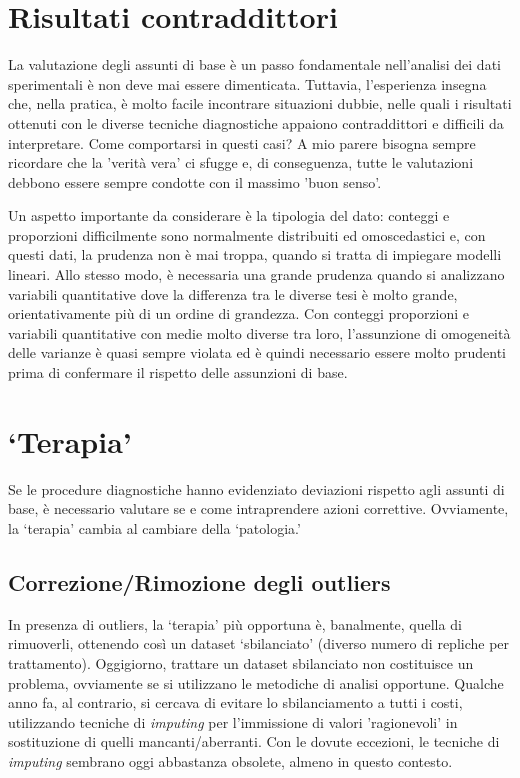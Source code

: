 \documentclass[a4paper,12pt,oneside]{book}
\begin{document}
\hypertarget{risultati-contraddittori}{%
\section{Risultati contraddittori}\label{risultati-contraddittori}}

La valutazione degli assunti di base è un passo fondamentale nell'analisi dei dati sperimentali è non deve mai essere dimenticata. Tuttavia, l'esperienza insegna che, nella pratica, è molto facile incontrare situazioni dubbie, nelle quali i risultati ottenuti con le diverse tecniche diagnostiche appaiono contraddittori e difficili da interpretare. Come comportarsi in questi casi? A mio parere bisogna sempre ricordare che la 'verità vera' ci sfugge e, di conseguenza, tutte le valutazioni debbono essere sempre condotte con il massimo 'buon senso'.

Un aspetto importante da considerare è la tipologia del dato: conteggi e proporzioni difficilmente sono normalmente distribuiti ed omoscedastici e, con questi dati, la prudenza non è mai troppa, quando si tratta di impiegare modelli lineari. Allo stesso modo, è necessaria una grande prudenza quando si analizzano variabili quantitative dove la differenza tra le diverse tesi è molto grande, orientativamente più di un ordine di grandezza. Con conteggi proporzioni e variabili quantitative con medie molto diverse tra loro, l'assunzione di omogeneità delle varianze è quasi sempre violata ed è quindi necessario essere molto prudenti prima di confermare il rispetto delle assunzioni di base.

\hypertarget{terapia}{%
\section{`Terapia'}\label{terapia}}

Se le procedure diagnostiche hanno evidenziato deviazioni rispetto agli assunti di base, è necessario valutare se e come intraprendere azioni correttive. Ovviamente, la `terapia' cambia al cambiare della `patologia.'

\hypertarget{correzionerimozione-degli-outliers}{%
\subsection{Correzione/Rimozione degli outliers}\label{correzionerimozione-degli-outliers}}

In presenza di outliers, la `terapia' più opportuna è, banalmente, quella di rimuoverli, ottenendo così un dataset `sbilanciato' (diverso numero di repliche per trattamento). Oggigiorno, trattare un dataset sbilanciato non costituisce un problema, ovviamente se si utilizzano le metodiche di analisi opportune. Qualche anno fa, al contrario, si cercava di evitare lo sbilanciamento a tutti i costi, utilizzando tecniche di \emph{imputing} per l'immissione di valori 'ragionevoli' in sostituzione di quelli mancanti/aberranti. Con le dovute eccezioni, le tecniche di \emph{imputing} sembrano oggi abbastanza obsolete, almeno in questo contesto.
\end{document}
